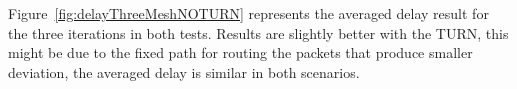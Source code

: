 Figure~\ref{fig:delayThreeMeshNOTURN} represents the averaged delay result for the three iterations in both tests. Results are slightly better with the TURN, this might be due to the fixed path for routing the packets that produce smaller deviation, the averaged delay is similar in both scenarios.

\FloatBarrier

%
%
%
%
